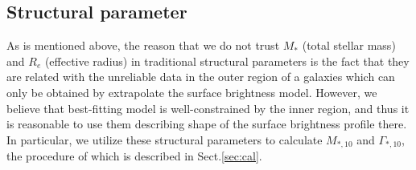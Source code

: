 \documentclass[fleqn,usenatbib]{mnras}
\begin{document}
\subsection{Structural parameter}
As is mentioned above, the reason that we do not trust $M_*$ (total stellar mass) and $R_e$ (effective radius) in traditional structural parameters is the fact that they are related with the unreliable data in the outer region of a galaxies which can only be obtained by extrapolate the surface brightness model. However, we believe that best-fitting model is well-constrained by the inner region, and thus it is reasonable to use them describing shape of the surface brightness profile there. In particular, we utilize these structural parameters to calculate $M_{*,10}$ and $\Gamma_{*,10}$, the procedure of which is described in Sect.\ref{sec:cal}. 
\end{document}
